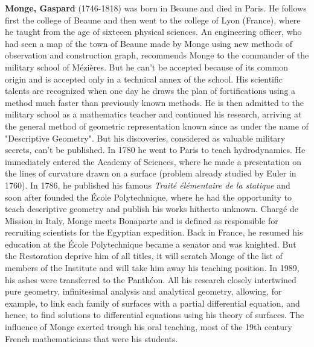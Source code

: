 \textbf{Monge, Gaspard} (1746-1818) was born in Beaune and died in Paris. He follows first the college of Beaune and then went to the college of Lyon (France), where he taught from the age of sixteeen physical sciences. An engineering officer, who had seen a map of the town of Beaune made by Monge using new methods of observation and construction graph, recommends Monge to the commander of the military school of Mézières. But he can't be accepted because of its common origin and is accepted only in a technical annex of the school. His scientific talents are recognized when one day he draws the plan of fortifications using a method much faster than previously known methods. He is then admitted to the military school as a mathematics teacher and continued his research, arriving at the general method of geometric representation known since as under the name of "Descriptive Geometry". But his discoveries, considered as valuable military secrets, can't be published. In 1780 he went to Paris to teach hydrodynamics. He immediately entered the Academy of Sciences, where he made a presentation on the lines of curvature drawn on a surface (problem already studied by Euler in 1760). In 1786, he published his famous \textit{Traité élémentaire de la statique} and soon after founded the École Polytechnique, where he had the opportunity to teach descriptive geometry and publish his works hitherto unknown. Chargé de Mission in Italy, Monge meets Bonaparte and is defined as responsible for recruiting scientists for the Egyptian expedition. Back in France, he resumed his education at the École Polytechnique became a senator and was knighted. But the Restoration deprive him of all titles, it will scratch Monge of the list of members of the Institute and will take him away his teaching position. In 1989, his ashes were transferred to the Panthéon. All his research closely intertwined pure geometry, infinitesimal analysis and analytical geometry, allowing, for example, to link each family of surfaces with a partial differential equation, and hence, to find solutions to differential equations using his theory of surfaces. The influence of Monge exerted trough his oral teaching, most of the 19th century French mathematicians that were his students.

{}

